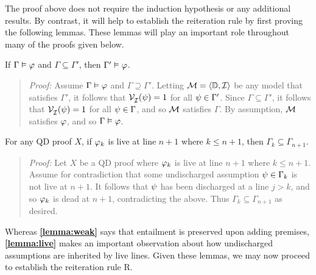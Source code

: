 The proof above does not require the induction hypothesis or any additional results.
By contrast, it will help to establish the reiteration rule by first proving the following lemmas.
These lemmas will play an important role throughout many of the proofs given below.

\begin{Lthm} \label{lemma:weak}
  If $\Gamma \vDash \varphi$ and $\Gamma \subseteq \Gamma'$, then $\Gamma' \vDash \varphi$.
\end{Lthm}

\begin{quote} 
  \textit{Proof:} Assume $\Gamma \vDash \varphi$ and $\Gamma \supseteq \Gamma'$.
  Letting $\mathcal{M}=\langle\mathbb{D},\mathcal{I}\rangle$ be any model that satisfies $\Gamma'$, it follows that $\mathcal{V}_{\mathcal{I}}^{}(\psi)=1$ for all $\psi \in \Gamma'$.
  Since $\Gamma\subseteq \Gamma'$, it follows that $\mathcal{V}_{\mathcal{I}}^{}(\psi)=1$ for all $\psi \in \Gamma$, and so $\mathcal{M}$ satisfies $\Gamma$. 
  By assumption, $\mathcal{M}$ satisfies $\varphi$, and so $\Gamma \vDash \varphi$.
\end{quote}



\begin{Lthm} \label{lemma:live}
  For any QD proof $X$, if $\varphi_k$ is live at line $n+1$ where $k\leq n+1$, then $\Gamma_k\subseteq \Gamma_{n+1}$.
\end{Lthm}

\begin{quote} 
  \textit{Proof:} Let $X$ be a QD proof where $\varphi_k$ is live at line $n+1$ where $k\leq n+1$.
  Assume for contradiction that some undischarged assumption $\psi \in \Gamma_k$ is not live at $n+1$.
  It follows that $\psi$ has been discharged at a line $j>k$, and so $\varphi_k$ is dead at $n+1$, contradicting the above.
  Thus $\Gamma_k\subseteq \Gamma_{n+1}$ as desired.
\end{quote}

Whereas \textbf{\ref{lemma:weak}} says that entailment is preserved upon adding premises, \textbf{\ref{lemma:live}} makes an important observation about how undischarged assumptions are inherited by live lines.
Given these lemmas, we may now proceed to establish the reiteration rule R.


